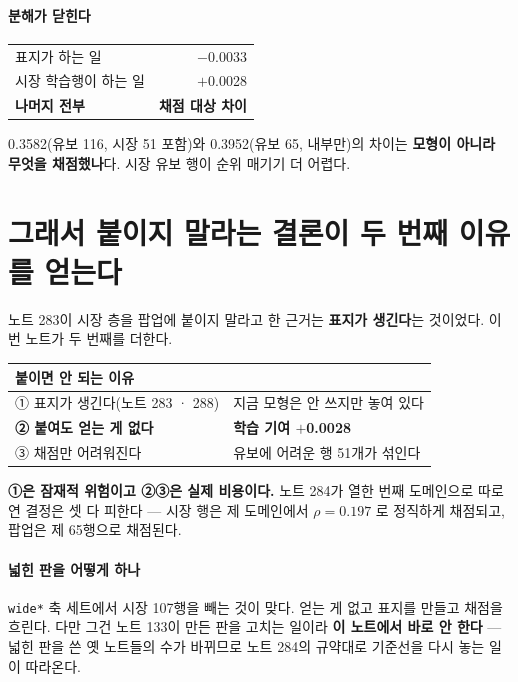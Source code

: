 \documentclass[10pt]{article}
\begin{document}
\paragraph{분해가 닫힌다}

\begin{center}\small
\begin{tabular}{lr}
\hline
표지가 하는 일 & $-$0.0033 \\
시장 학습행이 하는 일 & $+$0.0028 \\
\hline
\textbf{나머지 전부} & \textbf{채점 대상 차이} \\
\hline
\end{tabular}
\end{center}

0.3582(유보 116, 시장 51 포함)와 0.3952(유보 65, 내부만)의 차이는
\textbf{모형이 아니라 무엇을 채점했나}다. 시장 유보 행이 순위 매기기 더
어렵다.

\section{그래서 붙이지 말라는 결론이 두 번째 이유를 얻는다}

노트 283이 시장 층을 팝업에 붙이지 말라고 한 근거는 \textbf{표지가 생긴다}는
것이었다. 이번 노트가 두 번째를 더한다.

\begin{center}\small
\begin{tabular}{ll}
\hline
붙이면 안 되는 이유 & \\
\hline
① 표지가 생긴다(노트 283 · 288) & 지금 모형은 안 쓰지만 놓여 있다 \\
\textbf{② 붙여도 얻는 게 없다} & \textbf{학습 기여 $+$0.0028} \\
③ 채점만 어려워진다 & 유보에 어려운 행 51개가 섞인다 \\
\hline
\end{tabular}
\end{center}

\textbf{①은 잠재적 위험이고 ②③은 실제 비용이다.} 노트 284가 열한 번째
도메인으로 따로 연 결정은 셋 다 피한다 --- 시장 행은 제 도메인에서
$\rho{=}0.197$ 로 정직하게 채점되고, 팝업은 제 65행으로 채점된다.

\paragraph{넓힌 판을 어떻게 하나} \texttt{wide*} 축 세트에서 시장 107행을
빼는 것이 맞다. 얻는 게 없고 표지를 만들고 채점을 흐린다. 다만 그건 노트
133이 만든 판을 고치는 일이라 \textbf{이 노트에서 바로 안 한다} --- 넓힌
판을 쓴 옛 노트들의 수가 바뀌므로 노트 284의 규약대로 기준선을 다시 놓는
일이 따라온다.
\end{document}
